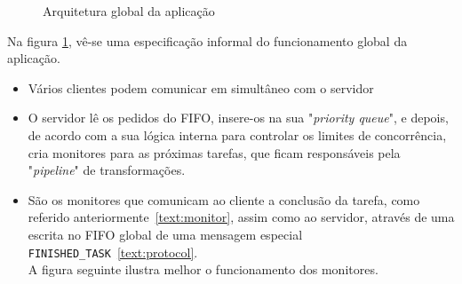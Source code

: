 \documentclass[11pt,a4paper]{report}%
\begin{document}
\newpage

\begin{figure}
\centering
{}
\caption{Arquitetura global da aplicação}
\label{fig:architecture}
\end{figure}

Na figura \ref{fig:architecture}, vê-se uma especificação informal do funcionamento global
da aplicação.

\begin{itemize}
  \item Vários clientes podem comunicar em simultâneo com o servidor
  \item O servidor lê os pedidos do FIFO, insere-os na sua "\textit{priority queue}", e depois,
  de acordo com a sua lógica interna para controlar os limites de concorrência, cria monitores para as próximas
  tarefas, que ficam responsáveis pela "\textit{pipeline}" de transformações.
  \item São os monitores que comunicam ao cliente a conclusão da tarefa, como referido
  anteriormente~\ref{text:monitor}, assim como ao servidor, através de uma escrita no FIFO global de uma
  mensagem especial \texttt{FINISHED\_TASK}~\ref{text:protocol}.\\
  A figura seguinte ilustra melhor o funcionamento dos monitores.

\end{itemize}
\end{document}
